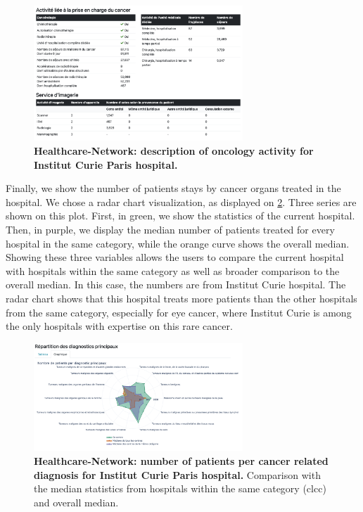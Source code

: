 \begin{figure}[h]
    \includegraphics[width=0.7\textwidth]{images/healthcare-network/curie-cancero.png}
    \centering
    \caption{
        \textbf{Healthcare-Network: description of oncology activity for Institut Curie Paris hospital.}
    }
    \label{fig:hn-curie-cancero}
\end{figure}

Finally, we show the number of patients stays by cancer organs treated in the
hospital. We chose a radar chart visualization, as displayed on
\cref{fig:hn-curie-dp}. Three series are shown on this plot. First, in green, we
show the statistics of the current hospital. Then, in purple, we display the
median number of patients treated for every hospital in the same category, while
the orange curve shows the overall median. Showing these three variables allows
the users to compare the current hospital with hospitals within the same
category as well as broader comparison to the overall median. In this case, the
numbers are from Institut Curie hospital. The radar chart shows that this
hospital treats more patients than the other hospitals from the same category,
especially for eye cancer, where Institut Curie is among the only hospitals with
expertise on this rare cancer.

\begin{figure}[h]
    \includegraphics[width=0.7\textwidth]{images/healthcare-network/curie-dp.png}
    \centering
    \caption{ \textbf{Healthcare-Network: number of patients per cancer related
            diagnosis for Institut Curie Paris hospital.} Comparison with the median
        statistics from hospitals within the same category (\ac{clcc}) and
        overall median. }
    \label{fig:hn-curie-dp}
\end{figure}

